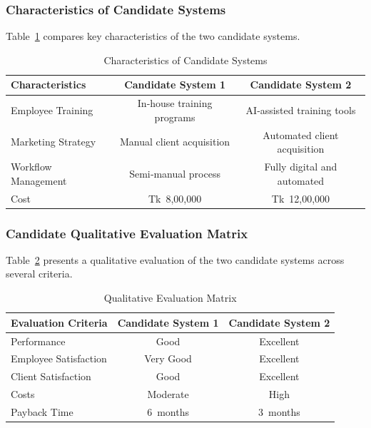 \documentclass[12pt,a4paper]{article}
\begin{document}
\newpage
\subsubsection{Characteristics of Candidate Systems}
Table~\ref{tab:characteristics} compares key characteristics of the two candidate systems.

\begin{table}[H]
    \centering
    \renewcommand{\arraystretch}{1.3}
    \begin{tabular}{|p{4.5cm}|c|c|}
        \hline
        \rowcolor{tableheader}
        \textcolor{headertext}{\textbf{Characteristics}} & \textcolor{headertext}{\textbf{Candidate System 1}} & \textcolor{headertext}{\textbf{Candidate System 2}} \\
        \hline
        Employee Training & In‑house training programs & AI‑assisted training tools \\
        \hline
        Marketing Strategy & Manual client acquisition & Automated client acquisition \\
        \hline
        Workflow Management & Semi‑manual process & Fully digital and automated \\
        \hline
        Cost & Tk 8{,}00{,}000 & Tk 12{,}00{,}000 \\
        \hline
    \end{tabular}
    \caption{Characteristics of Candidate Systems}
    \label{tab:characteristics}
\end{table}

\subsubsection{Candidate Qualitative Evaluation Matrix}
Table~\ref{tab:qualitative_matrix} presents a qualitative evaluation of the two candidate systems across several criteria.

\begin{table}[H]
    \centering
    \renewcommand{\arraystretch}{1.3}
    \begin{tabular}{|p{4cm}|c|c|}
        \hline
        \rowcolor{tableheader}
        \textcolor{headertext}{\textbf{Evaluation Criteria}} & \textcolor{headertext}{\textbf{Candidate System 1}} & \textcolor{headertext}{\textbf{Candidate System 2}} \\
        \hline
        Performance & Good & Excellent \\
        \hline
        Employee Satisfaction & Very Good & Excellent \\
        \hline
        Client Satisfaction & Good & Excellent \\
        \hline
        Costs & Moderate & High \\
        \hline
        Payback Time & 6 months & 3 months \\
        \hline
    \end{tabular}
    \caption{Qualitative Evaluation Matrix}
    \label{tab:qualitative_matrix}
\end{table}
\end{document}

